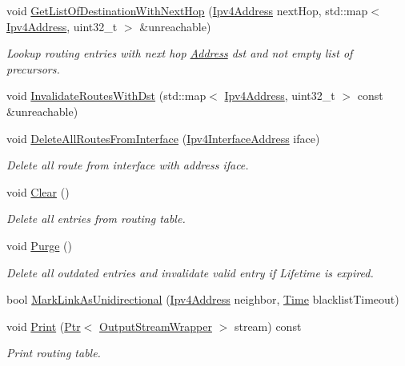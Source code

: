 \begin{DoxyCompactItemize}
void \hyperlink{classns3_1_1aodv_1_1RoutingTable_a0315dabaf863f63cce72eed5c97bd423}{Get\+List\+Of\+Destination\+With\+Next\+Hop} (\hyperlink{classns3_1_1Ipv4Address}{Ipv4\+Address} next\+Hop, std\+::map$<$ \hyperlink{classns3_1_1Ipv4Address}{Ipv4\+Address}, uint32\+\_\+t $>$ \&unreachable)
\begin{DoxyCompactList}\small\item\em Lookup routing entries with next hop \hyperlink{classns3_1_1Address}{Address} dst and not empty list of precursors. \end{DoxyCompactList}\item 
void \hyperlink{classns3_1_1aodv_1_1RoutingTable_a18a8d2cfcba8e03de2a086e4dcaa7d2f}{Invalidate\+Routes\+With\+Dst} (std\+::map$<$ \hyperlink{classns3_1_1Ipv4Address}{Ipv4\+Address}, uint32\+\_\+t $>$ const \&unreachable)
\item 
void \hyperlink{classns3_1_1aodv_1_1RoutingTable_aab31b6642a68709ff3453c72d979ba1a}{Delete\+All\+Routes\+From\+Interface} (\hyperlink{classns3_1_1Ipv4InterfaceAddress}{Ipv4\+Interface\+Address} iface)
\begin{DoxyCompactList}\small\item\em Delete all route from interface with address iface. \end{DoxyCompactList}\item 
void \hyperlink{classns3_1_1aodv_1_1RoutingTable_ab5ff83df58f2178615be8a8881dbbcd6}{Clear} ()
\begin{DoxyCompactList}\small\item\em Delete all entries from routing table. \end{DoxyCompactList}\item 
void \hyperlink{classns3_1_1aodv_1_1RoutingTable_a2d0250f231e06733c06a43f5ec6a310b}{Purge} ()
\begin{DoxyCompactList}\small\item\em Delete all outdated entries and invalidate valid entry if Lifetime is expired. \end{DoxyCompactList}\item 
bool \hyperlink{classns3_1_1aodv_1_1RoutingTable_ae82d9009d8a05047561df8896c4c4d57}{Mark\+Link\+As\+Unidirectional} (\hyperlink{classns3_1_1Ipv4Address}{Ipv4\+Address} neighbor, \hyperlink{classns3_1_1Time}{Time} blacklist\+Timeout)
\item 
void \hyperlink{classns3_1_1aodv_1_1RoutingTable_a96ea03f8cb07c9cdedb43e08bc000ae7}{Print} (\hyperlink{classns3_1_1Ptr}{Ptr}$<$ \hyperlink{classns3_1_1OutputStreamWrapper}{Output\+Stream\+Wrapper} $>$ stream) const 
\begin{DoxyCompactList}\small\item\em Print routing table. \end{DoxyCompactList}\end{DoxyCompactItemize}
